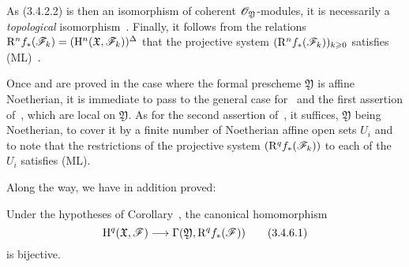 \begin{env}[3.4.5]
As (3.4.2.2) is then an isomorphism of coherent $\mathscr{O}_\mathfrak{Y}$-modules, it is necessarily a \emph{topological} isomorphism~.
Finally, it follows from the relations $\mathrm{R}^n f_*(\mathscr{F}_k)=(\mathrm{H}^n(\mathfrak{X},\mathscr{F}_k))^\Delta$ that the projective system $(\mathrm{R}^n f_*(\mathscr{F}_k))_{k\geqslant 0}$ satisfies (ML)~.

Once  and  are proved in the case where the formal prescheme $\mathfrak{Y}$ is affine Noetherian, it is immediate to pass to the general case for~ and the first assertion of~, which are local on $\mathfrak{Y}$.
As for the second assertion of~, it suffices, $\mathfrak{Y}$ being Noetherian, to cover it by a finite number of Noetherian affine open sets $U_i$ and to note that the restrictions of the projective system $(\mathrm{R}^q f_*(\mathscr{F}_k))$ to each of the $U_i$ satisfies (ML).
\end{env}

Along the way, we have in addition proved:
\begin{corollary}[3.4.6]
\label{III.3.4.6}
Under the hypotheses of Corollary~, the canonical homomorphism
\[
\label{III.3.4.6.1}
  \HH^q(\mathfrak{X},\sh{F})\to\Gamma(\mathfrak{Y},\RR^q f_*(\sh{F}))
  \tag{3.4.6.1}
\]
is bijective.
\end{corollary}

